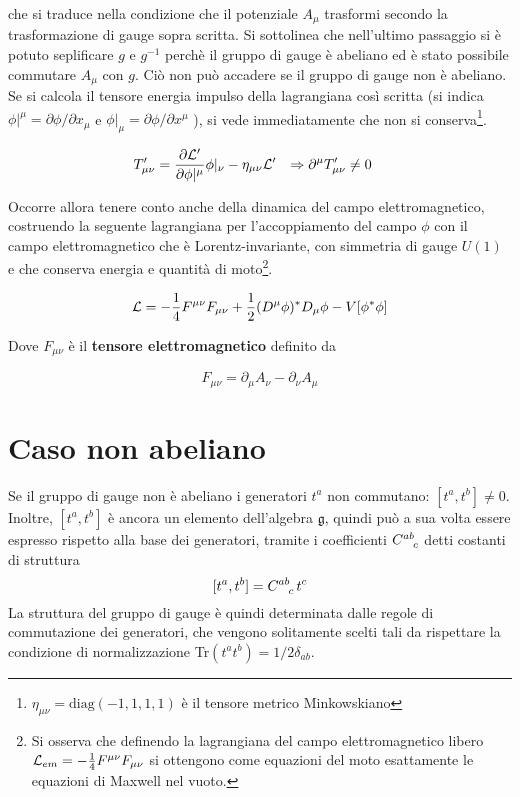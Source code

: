 che si traduce nella condizione che il potenziale $A _\mu$ trasformi secondo la
trasformazione di gauge sopra scritta.
Si sottolinea che nell'ultimo passaggio si è potuto seplificare $g$ e $ g^{-1} $
perchè il gruppo di gauge è abeliano ed è stato possibile commutare $ A _\mu $
con $g$. Ciò non può accadere se il gruppo di gauge non è abeliano.  \\

Se si calcola il tensore energia impulso della lagrangiana così scritta (si indica
$\phi| ^{\mu} = \partial \phi / \partial x_\mu$ e
$\phi| _{\mu} = \partial \phi / \partial x^\mu$ ), si vede immediatamente che non si
conserva\footnote{
   $\eta _{\mu\nu} = \mathrm{diag}(-1,1,1,1)$ è il tensore metrico Minkowskiano
}.

\begin{equation}
   \begin{aligned}
      T'_{\mu\nu} & = \frac{\partial \mathcal{L}'}{\partial \phi|^{\mu}}\phi|_{\nu}
      - \eta _{\mu\nu} \mathcal{L}' &
      \Rightarrow \partial ^\mu T'_{\mu\nu} & \neq 0
   \end{aligned}
\end{equation}

Occorre allora tenere conto anche della dinamica del campo elettromagnetico, costruendo
la seguente lagrangiana per l'accoppiamento del campo $\phi$ con il campo elettromagnetico
che è Lorentz-invariante, con simmetria di gauge $U(1)$ e che conserva energia e
quantità di moto\footnote{
   Si osserva che definendo la lagrangiana del campo elettromagnetico libero
   $
      \mathcal{L} _{em} = - \frac{1}{4}F^{\mu\nu} F_{\mu\nu}
   $
   si ottengono come equazioni del moto esattamente le equazioni di Maxwell nel vuoto.
}.

\begin{equation}
\mathcal{L} = -\frac{1}{4} F^{\mu\nu}F_{\mu\nu}
+ \frac{1}{2} (D^\mu \phi)^* D _\mu \phi - V[\phi^* \phi]
\end{equation}

Dove $F_{\mu\nu}$ è il \textbf{tensore elettromagnetico} definito da

$$
   F_{\mu\nu} = \partial _\mu A _\nu - \partial _\nu A _\mu
$$

\section{Caso non abeliano}
Se il gruppo di gauge non è abeliano i generatori $t^a$ non commutano: $[t^a,t^b] \neq 0$.
Inoltre, $[t^a,t^b]$ è ancora un elemento dell'algebra $\mathfrak{g}$, quindi può a sua
volta essere espresso rispetto alla base dei generatori, tramite i coefficienti
$C^{ab}_{\hphantom{ab}c}$ detti costanti di struttura
$$
   [t^a,t^b] = C^{ab}_{\hphantom{ab}c} \, t^c
$$
La struttura del gruppo di gauge è quindi determinata dalle regole di commutazione
dei generatori, che vengono solitamente scelti tali da rispettare la condizione di
normalizzazione Tr$(t^a t^b) = 1/2 \delta_{ab}$.\\

